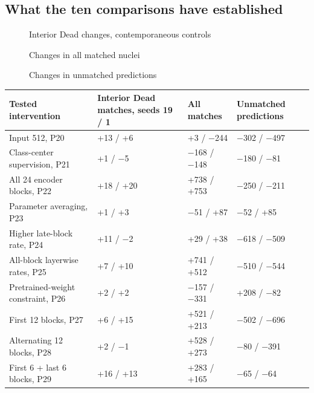 \documentclass[
  11pt,
]{article}
\begin{document}
\subsection{What the ten comparisons have
established}\label{what-the-ten-comparisons-have-established}

\begin{figure}[H]\centering

\caption{Interior Dead changes, contemporaneous controls}
\end{figure}

\begin{figure}[H]\centering

\caption{Changes in all matched nuclei}
\end{figure}

\begin{figure}[H]\centering

\caption{Changes in unmatched predictions}
\end{figure}

\begin{longtable}[]{@{}
  >{\raggedright\arraybackslash}p{}
  >{\raggedleft\arraybackslash}p{}
  >{\raggedleft\arraybackslash}p{}
  >{\raggedleft\arraybackslash}p{}@{}}
\toprule\noalign{}
\begin{minipage}[b]{\linewidth}\raggedright
Tested intervention
\end{minipage} & \begin{minipage}[b]{\linewidth}\raggedleft
Interior Dead matches, seeds 19 / 1
\end{minipage} & \begin{minipage}[b]{\linewidth}\raggedleft
All matches
\end{minipage} & \begin{minipage}[b]{\linewidth}\raggedleft
Unmatched predictions
\end{minipage} \\
\midrule\noalign{}
\endhead
\bottomrule\noalign{}
\endlastfoot
Input 512, P20 & +13 / +6 & +3 / −244 & −302 / −497 \\
Class-center supervision, P21 & +1 / −5 & −168 / −148 & −180 / −81 \\
All 24 encoder blocks, P22 & +18 / +20 & +738 / +753 & −250 / −211 \\
Parameter averaging, P23 & +1 / +3 & −51 / +87 & −52 / +85 \\
Higher late-block rate, P24 & +11 / −2 & +29 / +38 & −618 / −509 \\
All-block layerwise rates, P25 & +7 / +10 & +741 / +512 & −510 / −544 \\
Pretrained-weight constraint, P26 & +2 / +2 & −157 / −331 & +208 /
−82 \\
First 12 blocks, P27 & +6 / +15 & +521 / +213 & −502 / −696 \\
Alternating 12 blocks, P28 & +2 / −1 & +528 / +273 & −80 / −391 \\
First 6 + last 6 blocks, P29 & +16 / +13 & +283 / +165 & −65 / −64 \\
\end{longtable}
\end{document}
